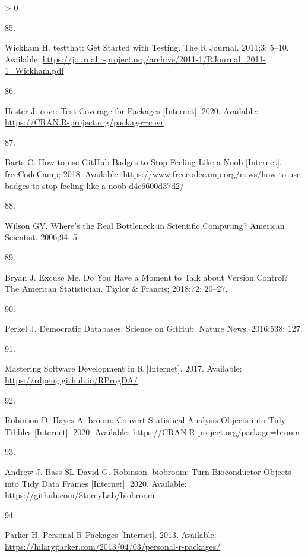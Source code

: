 \documentclass[10pt,letterpaper]{article}
\newlength{\csllabelwidth}
\newlength{\cslhangindent}
\newenvironment{CSLReferences}[3] %
 {%
  \setlength{\parindent}{0pt}
  \ifodd #1 \everypar{\setlength{\hangindent}{\cslhangindent}}\ignorespaces\fi
  \ifnum #2 > 0
  \setlength{\parskip}{#2\baselineskip}
  \fi
 }%
 {}
\newcommand{\CSLLeftMargin}[1]{\parbox[t]{\csllabelwidth}{#1}}
\newcommand{\CSLRightInline}[1]{\parbox[t]{\linewidth - \csllabelwidth}{#1}}
\begin{document}
\begin{CSLReferences}{0}{0}
\leavevmode\hypertarget{ref-testthat}{}%
\CSLLeftMargin{85. }
\CSLRightInline{Wickham H. {testthat: Get Started with Testing}. The R
Journal. 2011;3: 5--10. Available:
\url{https://journal.r-project.org/archive/2011-1/RJournal_2011-1_Wickham.pdf}}

\leavevmode\hypertarget{ref-covr}{}%
\CSLLeftMargin{86. }
\CSLRightInline{Hester J. {covr: Test Coverage for Packages}
{[}Internet{]}. 2020. Available:
\url{https://CRAN.R-project.org/package=covr}}

\leavevmode\hypertarget{ref-barts2018}{}%
\CSLLeftMargin{87. }
\CSLRightInline{Barts C. {How to use GitHub Badges to Stop Feeling Like
a Noob} {[}Internet{]}. freeCodeCamp; 2018. Available:
\url{https://www.freecodecamp.org/news/how-to-use-badges-to-stop-feeling-like-a-noob-d4e6600d37d2/}}

\leavevmode\hypertarget{ref-wilson2006}{}%
\CSLLeftMargin{88. }
\CSLRightInline{Wilson GV. {Where's the Real Bottleneck in Scientific
Computing?} American Scientist. 2006;94: 5. }

\leavevmode\hypertarget{ref-bryan2018}{}%
\CSLLeftMargin{89. }
\CSLRightInline{Bryan J. {Excuse Me, Do You Have a Moment to Talk about
Version Control?} The American Statistician. Taylor \& Francis; 2018;72:
20--27. }

\leavevmode\hypertarget{ref-perkel2016}{}%
\CSLLeftMargin{90. }
\CSLRightInline{Perkel J. {Democratic Databases: Science on GitHub}.
Nature News. 2016;538: 127. }

\leavevmode\hypertarget{ref-peng2017}{}%
\CSLLeftMargin{91. }
\CSLRightInline{{Mastering Software Development in R} {[}Internet{]}.
2017. Available: \url{https://rdpeng.github.io/RProgDA/}}

\leavevmode\hypertarget{ref-broom}{}%
\CSLLeftMargin{92. }
\CSLRightInline{Robinson D, Hayes A. {broom: Convert Statistical
Analysis Objects into Tidy Tibbles} {[}Internet{]}. 2020. Available:
\url{https://CRAN.R-project.org/package=broom}}

\leavevmode\hypertarget{ref-biobroom}{}%
\CSLLeftMargin{93. }
\CSLRightInline{Andrew J. Bass SL David G. Robinson. {biobroom: Turn
Bioconductor Objects into Tidy Data Frames} {[}Internet{]}. 2020.
Available: \url{https://github.com/StoreyLab/biobroom}}

\leavevmode\hypertarget{ref-parker2013}{}%
\CSLLeftMargin{94. }
\CSLRightInline{Parker H. {Personal R Packages} {[}Internet{]}. 2013.
Available:
\url{https://hilaryparker.com/2013/04/03/personal-r-packages/}}


\end{CSLReferences}
\end{document}

